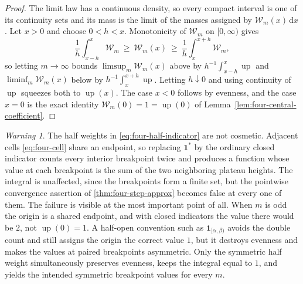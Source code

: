 \documentclass[11pt,oneside]{article}
\theoremstyle{definition}
\theoremstyle{remark}
\newtheorem{warning}[theorem]{Warning}
\newcommand{\Up}{\operatorname{up}}
\newcommand{\dd}{\,\mathrm d}
\begin{document}
\begin{proof}
The limit law has a continuous density, so every compact interval is one of its continuity
sets and its mass is the limit of the masses assigned by $\mathcal W_m(x)\dd x$.  Let
$x>0$ and choose $0<h<x$.  Monotonicity of $\mathcal W_m$ on $[0,\infty)$ gives
\begin{equation*}
 \frac1h\int_{x-h}^{x}\mathcal W_m
 \ \ge\ \mathcal W_m(x)\ \ge\ \frac1h\int_{x}^{x+h}\mathcal W_m ,
\end{equation*}
so letting $m\to\infty$ bounds $\limsup_m\mathcal W_m(x)$ above by
$h^{-1}\int_{x-h}^{x}\Up$ and $\liminf_m\mathcal W_m(x)$ below by
$h^{-1}\int_{x}^{x+h}\Up$.  Letting $h\downarrow0$ and using
continuity of $\Up$ squeezes both to $\Up(x)$.  The case $x<0$ follows by evenness, and the
case $x=0$ is the exact identity $\mathcal W_m(0)=1=\Up(0)$ of
Lemma~\ref{lem:four-central-coefficient}.
\end{proof}

\begin{warning}
The half weights in \eqref{eq:four-half-indicator} are not cosmetic.  Adjacent cells
\eqref{eq:four-cell} share an endpoint, so replacing $\mathbf 1^\ast$ by the ordinary closed
indicator counts every interior breakpoint twice and produces a function whose value at each
breakpoint is the sum of the two neighboring plateau heights.  The integral is unaffected,
since the breakpoints form a finite set, but the pointwise convergence assertion of
\cref{thm:four-step-approx} becomes false at every one of them.  The failure is visible at
the most important point of all.  When $m$ is odd the origin is a shared endpoint, and with
closed indicators the value there would be $2$, not $\Up(0)=1$.  A half-open convention such
as $\mathbf 1_{[\alpha,\beta)}$ avoids the double count and still assigns the origin the
correct value $1$, but it destroys evenness and makes the values at paired breakpoints
asymmetric.  Only the symmetric half weight simultaneously preserves evenness, keeps the
integral equal to $1$, and yields the intended symmetric breakpoint values for every $m$.
\end{warning}
\end{document}
